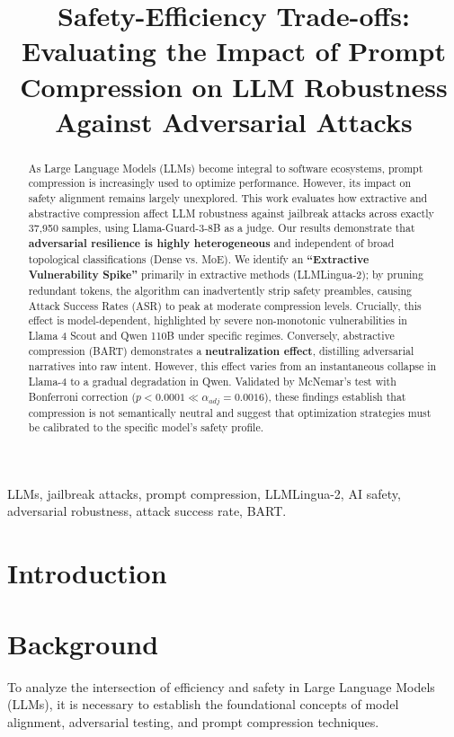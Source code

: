\documentclass[conference]{IEEEtran}
\title{Safety-Efficiency Trade-offs: Evaluating the Impact of Prompt Compression on LLM Robustness Against Adversarial Attacks}
\author{
    \IEEEauthorblockN{Luis Alberto Herbas Claure}
    \IEEEauthorblockA{\textit{Department of Systems Engineering} \\
    \textit{Universidad Católica Boliviana ``San Pablo''}\\
    Cochabamba, Bolivia}
    \and
    \IEEEauthorblockN{Roberto Asín}
    \IEEEauthorblockA{\textit{Department of Informatics Chile} \\
    \textit{Universidad Técnica Federico Santa María}\\
    Valparaíso, Chile}
}
\begin{document}
\maketitle

\begin{abstract}
As Large Language Models (LLMs) become integral to software ecosystems, prompt compression is increasingly used to optimize performance. However, its impact on safety alignment remains largely unexplored. This work evaluates how extractive and abstractive compression affect LLM robustness against jailbreak attacks across exactly 37,950 samples, using Llama-Guard-3-8B as a judge. Our results demonstrate that \textbf{adversarial resilience is highly heterogeneous} and independent of broad topological classifications (Dense vs. MoE). We identify an \textbf{``Extractive Vulnerability Spike''} primarily in extractive methods (LLMLingua-2); by pruning redundant tokens, the algorithm can inadvertently strip safety preambles, causing Attack Success Rates (ASR) to peak at moderate compression levels. Crucially, this effect is model-dependent, highlighted by severe non-monotonic vulnerabilities in Llama 4 Scout and Qwen 110B under specific regimes. Conversely, abstractive compression (BART) demonstrates a \textbf{neutralization effect}, distilling adversarial narratives into raw intent. However, this effect varies from an instantaneous collapse in Llama-4 to a gradual degradation in Qwen. Validated by McNemar's test with Bonferroni correction ($p < 0.0001 \ll \alpha_{adj} = 0.0016$), these findings establish that compression is not semantically neutral and suggest that optimization strategies must be calibrated to the specific model's safety profile.
\end{abstract}

\begin{IEEEkeywords}
LLMs, jailbreak attacks, prompt compression, LLMLingua-2, AI safety, adversarial robustness, attack success rate, BART.
\end{IEEEkeywords}

\section{Introduction}

\section{Background}

To analyze the intersection of efficiency and safety in Large Language Models (LLMs), it is necessary to establish the foundational concepts of model alignment, adversarial testing, and prompt compression techniques.
\end{document}
